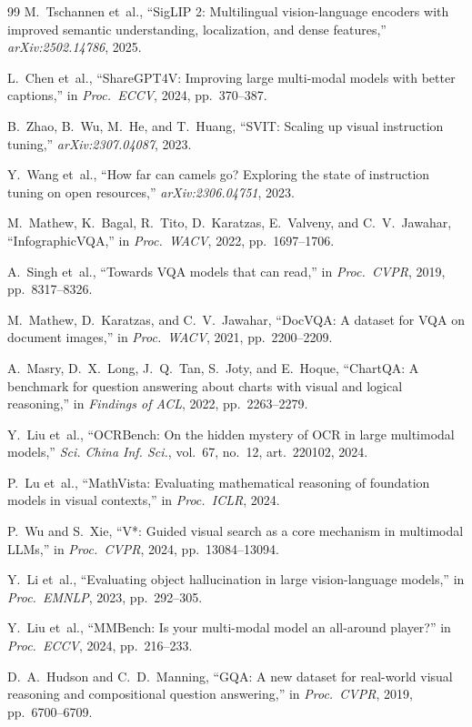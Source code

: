 \documentclass{article}
\begin{document}
{\begin{thebibliography}{99}
M.~Tschannen et~al.,
``SigLIP 2: Multilingual vision-language encoders with improved
semantic understanding, localization, and dense features,''
\emph{arXiv:2502.14786}, 2025.

L.~Chen et~al.,
``ShareGPT4V: Improving large multi-modal models with better
captions,''
in \emph{Proc.\ ECCV}, 2024, pp.~370--387.

B.~Zhao, B.~Wu, M.~He, and T.~Huang,
``SVIT: Scaling up visual instruction tuning,''
\emph{arXiv:2307.04087}, 2023.

Y.~Wang et~al.,
``How far can camels go? Exploring the state of instruction
tuning on open resources,''
\emph{arXiv:2306.04751}, 2023.

M.~Mathew, K.~Bagal, R.~Tito, D.~Karatzas, E.~Valveny, and
C.~V.~Jawahar,
``InfographicVQA,''
in \emph{Proc.\ WACV}, 2022, pp.~1697--1706.

A.~Singh et~al.,
``Towards VQA models that can read,''
in \emph{Proc.\ CVPR}, 2019, pp.~8317--8326.

M.~Mathew, D.~Karatzas, and C.~V.~Jawahar,
``DocVQA: A dataset for VQA on document images,''
in \emph{Proc.\ WACV}, 2021, pp.~2200--2209.

A.~Masry, D.~X.~Long, J.~Q.~Tan, S.~Joty, and E.~Hoque,
``ChartQA: A benchmark for question answering about charts
with visual and logical reasoning,''
in \emph{Findings of ACL}, 2022, pp.~2263--2279.

Y.~Liu et~al.,
``OCRBench: On the hidden mystery of OCR in large multimodal
models,''
\emph{Sci. China Inf. Sci.}, vol.~67, no.~12, art.~220102,
2024.

P.~Lu et~al.,
``MathVista: Evaluating mathematical reasoning of foundation
models in visual contexts,''
in \emph{Proc.\ ICLR}, 2024.

P.~Wu and S.~Xie,
``V*: Guided visual search as a core mechanism in multimodal
LLMs,''
in \emph{Proc.\ CVPR}, 2024, pp.~13084--13094.

Y.~Li et~al.,
``Evaluating object hallucination in large vision-language
models,''
in \emph{Proc.\ EMNLP}, 2023, pp.~292--305.

Y.~Liu et~al.,
``MMBench: Is your multi-modal model an all-around player?''
in \emph{Proc.\ ECCV}, 2024, pp.~216--233.

D.~A.~Hudson and C.~D.~Manning,
``GQA: A new dataset for real-world visual reasoning and
compositional question answering,''
in \emph{Proc.\ CVPR}, 2019, pp.~6700--6709.


\end{thebibliography}}
\end{document}
